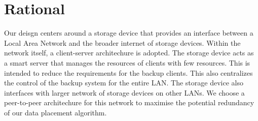 \section{Rational}

Our deisgn centers around a storage device that provides an interface between a Local Area Network and the broader internet of storage devices. Within the network itself, a client-server architechure is adopted. The storage device acts as a smart server that manages the resources of clients with few resources. This is intended to reduce the requirements for the backup clients. This also centralizes the control of the backup system for the entire LAN. The storage device also interfaces with larger network of storage devices on other LANs. We choose a peer-to-peer architechure for this network to maximise the potential redundancy of our data placement algorithm.
